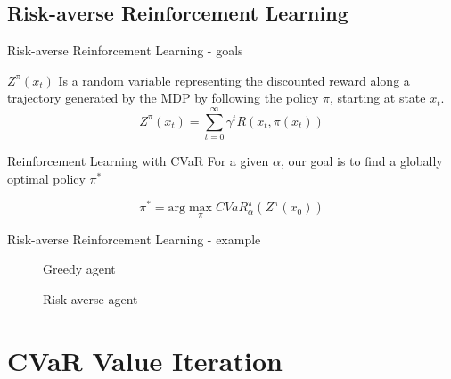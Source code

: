 \documentclass{beamer}
\begin{document}

\subsection{Risk-averse Reinforcement Learning}

\begin{frame}{Risk-averse Reinforcement Learning - goals}
\begin{definition}
$Z^\pi(x_t)$ Is a random variable representing the discounted reward along a trajectory generated by the MDP by following the policy $\pi$, starting at state $x_t$.
$$Z^\pi(x_{t})=\sum_{t=0}^\infty \gamma^tR(x_t,\pi(x_t))$$
\end{definition}

\begin{block}{Reinforcement Learning with CVaR}
For a given $\alpha$, our goal is to find a globally optimal policy $\pi^*$

$$\pi^* = \text{arg}\max_\pi CVaR^\pi_\alpha(Z^\pi(x_0))$$
\end{block}
\end{frame}


\begin{frame}{Risk-averse Reinforcement Learning - example}
\begin{figure}
    \centering
    \begin{minipage}{0.5\textwidth}
        \centering
        \caption{Greedy agent}
    \end{minipage}\hfill
    \begin{minipage}{0.5\textwidth}
        \centering
        \caption{Risk-averse agent}
    \end{minipage}
\end{figure}
\end{frame}


\section{CVaR Value Iteration}
\end{document}
